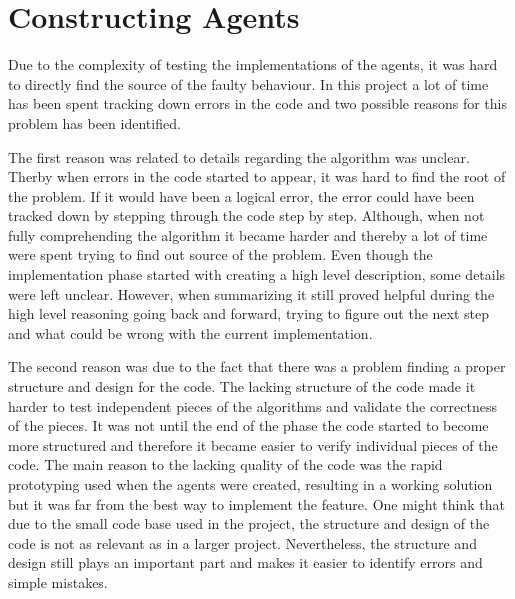 \section{Constructing Agents}
\label{ap:constructing_experiments}
Due to the complexity of testing the implementations of the agents, it was hard to directly find the source of the faulty behaviour. In this project a lot of time has been spent tracking down errors in the code and two possible reasons for this problem has been identified.

The first reason was related to details regarding the algorithm was unclear. Therby when errors in the code started to appear, it was hard to find the root of the problem. If it would have been a logical error, the error could have been tracked down by stepping through the code step by step. Although, when not fully comprehending the algorithm it became harder and thereby a lot of time were spent trying to find out source of the problem. Even though the implementation phase started with creating a high level description, some details were left unclear. However, when summarizing it still proved helpful during the high level reasoning going back and forward, trying to figure out the next step and what could be wrong with the current implementation.

The second reason was due to the fact that there was a problem finding a proper structure and design for the code. The lacking structure of the code made it harder to test independent pieces of the algorithms and validate the correctness of the pieces. It was not until the end of the phase the code started to become more structured and therefore it became easier to verify individual pieces of the code. The main reason to the lacking quality of the code was the rapid prototyping used when the agents were created, resulting in a working solution but it was far from the best way to implement the feature. One might think that due to the small code base used in the project, the structure and design of the code is not as relevant as in a larger project. Nevertheless, the structure and design still plays an important part and makes it easier to identify errors and simple mistakes.